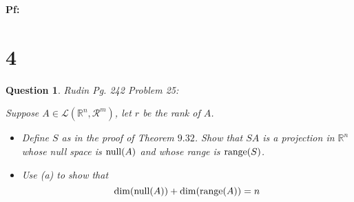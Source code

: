 \documentclass{article}
\newtheorem{question}{Question}
\begin{document}
\textbf{Pf:}

\break

\section*{4}
\begin{myBox}[]{}
    \begin{question}
        Rudin Pg. 242 Problem 25:

        Suppose $A\in\mathcal{L}(\mathbb{R}^n,\mathcal{R}^m)$, let $r$ be the rank of $A$.
        \begin{itemize}
            \item[(a)] Define $S$ as in the proof of Theorem $9.32$. Show that $SA$ is a projection in $\mathbb{R}^n$ whose null space is $\textmd{null}(A)$ and whose range is $\textmd{range}(S)$.
            \item[(b)] Use (a) to show that 
            $$\dim(\textmd{null}(A))+\dim(\textmd{range}(A))=n$$
        \end{itemize}
    \end{question}
\end{myBox}
\end{document}

